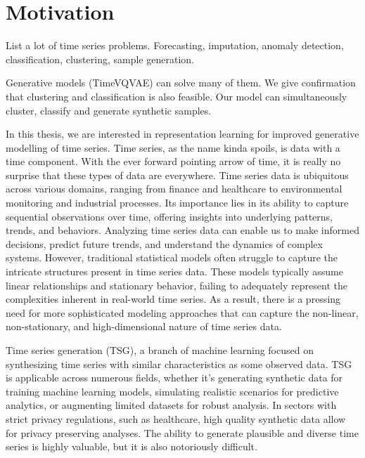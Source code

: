 \documentclass[../../thesis.tex]{subfiles}
\begin{document}
\section{Motivation}

List a lot of time series problems. Forecasting, imputation, anomaly detection, classification, clustering, sample generation. 

Generative models (TimeVQVAE) can solve many of them. We give confirmation that clustering and classification is also feasible. Our model can simultaneously cluster, classify and generate synthetic samples.


In this thesis, we are interested in representation learning for improved generative modelling of time series. Time series, as the name kinda spoils, is data with a time component. With the ever forward pointing arrow of time, it is really no surprise that these types of data are everywhere. Time series data is ubiquitous across various domains, ranging from finance and healthcare to environmental monitoring and industrial processes. Its importance lies in its ability to capture sequential observations over time, offering insights into underlying patterns, trends, and behaviors. Analyzing time series data can enable us to make informed decisions, predict future trends, and understand the dynamics of complex systems. However, traditional statistical models often struggle to capture the intricate structures present in time series data. These models typically assume linear relationships and stationary behavior, failing to adequately represent the complexities inherent in real-world time series. As a result, there is a pressing need for more sophisticated modeling approaches that can capture the non-linear, non-stationary, and high-dimensional nature of time series data.\newline

Time series generation (TSG), a branch of machine learning focused on synthesizing time series with similar characteristics as some observed data. TSG is applicable across numerous fields, whether it's generating synthetic data for training machine learning models, simulating realistic scenarios for predictive analytics, or augmenting limited datasets for robust analysis. In sectors with strict privacy regulations, such as healthcare, high quality synthetic data allow for privacy preserving analyses. The ability to generate plausible and diverse time series is highly valuable, but it is also notoriously difficult.\newline
\end{document}
